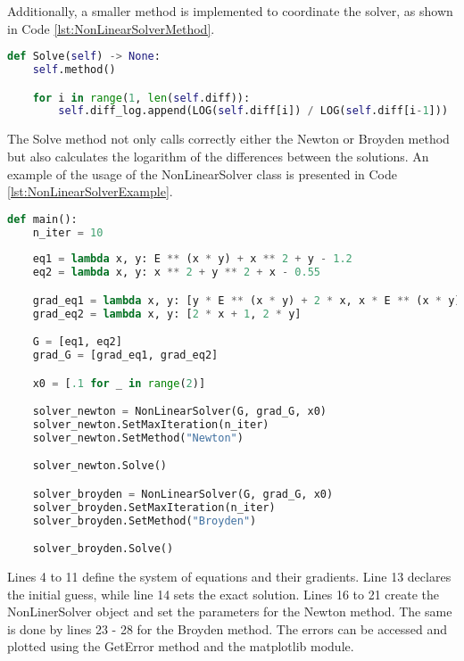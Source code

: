 Additionally, a smaller method is implemented to coordinate the solver, as shown in Code \ref{lst:NonLinearSolverMethod}.
\begin{lstlisting}[language=Python, caption=NonLinearSolver method, label=lst:NonLinearSolverMethod]
def Solve(self) -> None:
    self.method()

    for i in range(1, len(self.diff)):
        self.diff_log.append(LOG(self.diff[i]) / LOG(self.diff[i-1]))
\end{lstlisting}

The Solve method not only calls correctly either the Newton or Broyden method but also calculates the logarithm of the differences between the solutions. An example of the usage of the NonLinearSolver class is presented in Code \ref{lst:NonLinearSolverExample}.
\begin{lstlisting}[language=Python, caption=NonLinearSolver example, label=lst:NonLinearSolverExample]
def main():
    n_iter = 10
    
    eq1 = lambda x, y: E ** (x * y) + x ** 2 + y - 1.2
    eq2 = lambda x, y: x ** 2 + y ** 2 + x - 0.55

    grad_eq1 = lambda x, y: [y * E ** (x * y) + 2 * x, x * E ** (x * y) + 1]
    grad_eq2 = lambda x, y: [2 * x + 1, 2 * y]

    G = [eq1, eq2]
    grad_G = [grad_eq1, grad_eq2]

    x0 = [.1 for _ in range(2)]

    solver_newton = NonLinearSolver(G, grad_G, x0)
    solver_newton.SetMaxIteration(n_iter)
    solver_newton.SetMethod("Newton")

    solver_newton.Solve()

    solver_broyden = NonLinearSolver(G, grad_G, x0)
    solver_broyden.SetMaxIteration(n_iter)
    solver_broyden.SetMethod("Broyden")

    solver_broyden.Solve()
\end{lstlisting}

Lines 4 to 11 define the system of equations and their gradients. Line 13 declares the initial guess, while line 14 sets the exact solution. Lines 16 to 21 create the NonLinerSolver object and set the parameters for the Newton method. The same is done by lines 23 - 28 for the Broyden method. The errors can be accessed and plotted using the GetError method and the matplotlib module.